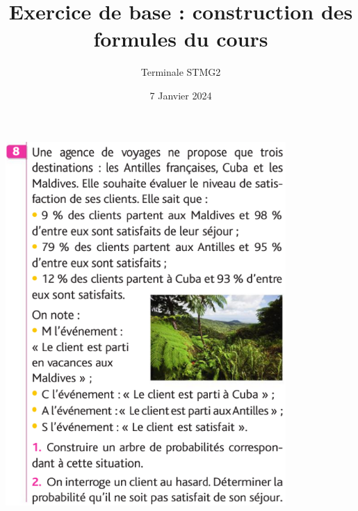 \documentclass{article}
\title{Exercice de base : construction des formules du cours}
\author{Terminale STMG2}
\date{7 Janvier 2024}
\begin{document}
\maketitle
\begin{center}
\includegraphics[width=0.8\textwidth]{Exercice_cours.png}
\end{center}
\end{document}
